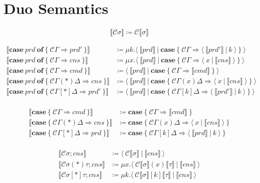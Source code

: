 \documentclass[11pt]{article}
\newcommand{\translate}[1]{\llbracket #1 \rrbracket}
\newcommand{\C}{\mathcal{C}}
\newcommand{\case}[1]{\mathbf{case}\ \{\ #1\ \}}
\newcommand{\caseof}[2]{\mathbf{case}\ #1\ \mathbf{of}\ \{\ #2\ \}}
\newcommand{\pat}[1]{\C\Gamma \Rightarrow #1 }
\newcommand{\prdpat}[2]{\C\Gamma(#1)\Delta \Rightarrow #2 }
\newcommand{\cnspat}[2]{\C\Gamma[#1]\Delta \Rightarrow #2 }
\newcommand{\cut}[2]{\langle\ #1\ |\ #2\ \rangle}
\begin{document}
\section{Duo Semantics}

\begin{align*}
  \translate{\C\sigma} \coloneqq \C\translate{\sigma}
\end{align*}

\begin{align*}
  \translate{\caseof{prd}{\pat{prd'}}} &\coloneqq \mu k.\cut{\translate{prd}}{\case{\pat{\cut{\translate{prd'}}{k}}}}\\
  \translate{\caseof{prd}{\pat{cns}}} &\coloneqq \mu x.\cut{\translate{prd}}{\case{\pat{\cut{x}{\translate{cns}}}}}\\
  \translate{\caseof{prd}{\pat{cmd}}} &\coloneqq \cut{\translate{prd}}{\case{\pat{\translate{cmd}}}}\\
  \translate{\caseof{prd}{\prdpat{*}{cns}}} &\coloneqq \cut{\translate{prd}}{\case{\prdpat{x}{\cut{x}{\translate{cns}}}}} \\
  \translate{\caseof{prd}{\cnspat{*}{prd'}}} &\coloneqq \cut{\translate{prd}}{\case{\cnspat{k}{\cut{\translate{prd'}}{k}}}} \\
\end{align*}

\begin{align*}
  \translate{\case{\pat{cmd}}} &\coloneqq \case{\pat{\translate{cmd}}} \\
  \translate{\case{\prdpat{*}{cns}}} &\coloneqq \case{\prdpat{x}{\cut{x}{\translate{cns}}}} \\
  \translate{\case{\cnspat{*}{prd}}} &\coloneqq \case{\cnspat{k}{\cut{\translate{prd}}{k}}} \\
\end{align*}

\begin{align*}
  \translate{\C\sigma;cns} &\coloneqq \cut{\C\translate{\sigma}}{\translate{cns}} \\
  \translate{\C\sigma(*)\tau;cns} &\coloneqq \mu x.\cut{\C\translate{\sigma}(x)\translate{\tau}}{\translate{cns}} \\
  \translate{\C\sigma[*]\tau;cns} &\coloneqq \mu k.\cut{\C\translate{\sigma}[k]\translate{\tau}}{\translate{cns}} \\
\end{align*}
\end{document}
